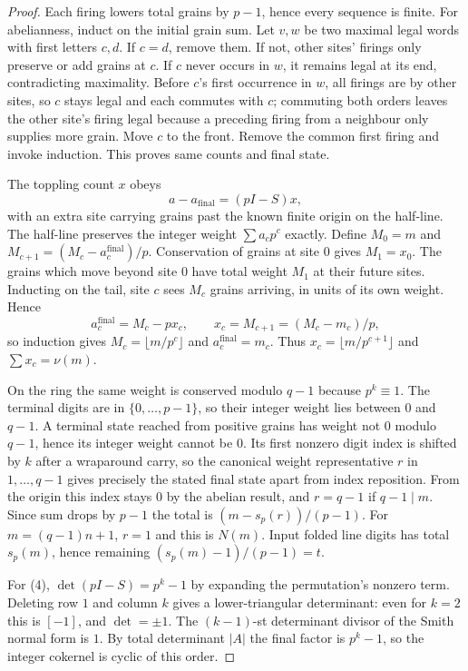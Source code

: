 \documentclass[10pt]{article}
\theoremstyle{definition}\newtheorem*{definition}{Definition}
\theoremstyle{remark}\newtheorem*{remark}{Remark}
\begin{document}
\begin{proof} Each firing lowers total grains by $p-1$, hence every sequence
is finite. For abelianness, induct on the initial grain sum. Let $v,w$ be two
maximal legal words with first letters $c,d$. If $c=d$, remove them. If not,
other sites' firings only preserve or add grains at $c$. If $c$ never occurs in
$w$, it remains legal at its end, contradicting maximality. Before $c$'s first
occurrence in $w$, all firings are by other sites, so $c$ stays legal and each
commutes with $c$; commuting both orders leaves the other site's firing legal
because a preceding firing from a neighbour only supplies more grain. Move $c$
to the front. Remove the common first firing and invoke induction. This proves
same counts and final state.

The toppling count $x$ obeys
\[
 a-a_{\mathrm{final}}=(pI-S)x,
\]
with an extra site carrying grains past the known finite origin on the half-line.
The half-line preserves the integer weight $\sum a_cp^c$ exactly. Define
$M_0=m$ and $M_{c+1}=(M_c-a_c^{\mathrm{final}})/p$. Conservation of grains at
site $0$ gives $M_1=x_0$. The grains which move beyond site $0$ have total
weight $M_1$ at their future sites. Inducting on the tail, site $c$ sees
$M_c$ grains arriving, in units of its own weight. Hence
\[
 a_c^{\mathrm{final}}=M_c-px_c,\qquad x_c=M_{c+1}=(M_c-m_c)/p,
\]
so induction gives $M_c=\lfloor m/p^c\rfloor$ and $a_c^{\mathrm{final}}=m_c$.
Thus $x_c=\lfloor m/p^{c+1}\rfloor$ and $\sum x_c=\nu(m)$.

On the ring the same weight is conserved modulo $q-1$ because $p^k\equiv1$.
The terminal digits are in $\{0,\ldots,p-1\}$, so their integer weight lies
between $0$ and $q-1$. A terminal state reached from positive grains has
weight not $0$ modulo $q-1$, hence its integer weight cannot be $0$. Its first
nonzero digit index is shifted by $k$ after a wraparound carry, so the canonical
weight representative $r$ in $1,\ldots,q-1$ gives precisely the stated final
state apart from index reposition. From the origin this index stays $0$ by the
abelian result, and $r=q-1$ if $q-1\mid m$. Since sum drops by $p-1$ the total
is $(m-s_p(r))/(p-1)$. For $m=(q-1)n+1$, $r=1$ and this is $N(m)$. Input
folded line digits has total $s_p(m)$, hence remaining $(s_p(m)-1)/(p-1)=t$.

For (4), $\det(pI-S)=p^k-1$ by expanding the permutation's nonzero term.
Deleting row $1$ and column $k$ gives a lower-triangular determinant: even for
$k=2$ this is $[-1]$, and $\det=\pm1$. The $(k-1)$-st determinant divisor of
the Smith normal form is $1$. By total determinant $|A|$ the final factor is
$p^k-1$, so the integer cokernel is cyclic of this order.\end{proof}
\end{document}
